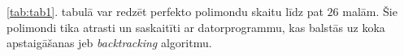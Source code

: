 \documentclass[utf8]{ludis2022}
\begin{document}
\firstparskip \ref{tab:tab1}. tabulā var redzēt perfekto polimondu skaitu līdz pat $26$ malām. Šie polimondi tika atrasti un saskaitīti ar datorprogrammu, kas balstās uz koka apstaigāšanas jeb 
{\em backtracking} algoritmu.

\end{document}
